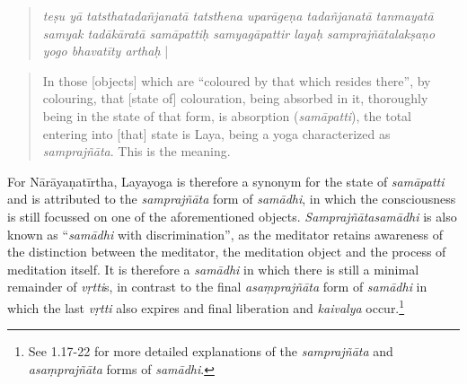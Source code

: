\begin{quote}
\textit{teṣu yā tatsthatadañjanatā tatsthena uparāgeṇa tadañjanatā tanmayatā samyak tadākāratā samāpattiḥ samyagāpattir layaḥ samprajñātalakṣaṇo yogo bhavatīty arthaḥ} |
\end{quote}
\begin{quote}
In those [objects] which are ``coloured by that which resides there'', by colouring, that [state of] colouration, being absorbed in it, thoroughly being in the state of that form, is absorption (\textit{samāpatti}), the total entering into [that] state is Laya, being a yoga characterized as \textit{samprajñāta}. This is the meaning.
\end{quote}

For Nārāyaṇatīrtha, Layayoga is therefore a synonym for the state of \textit{samāpatti} and is attributed to the \textit{samprajñāta} form of \textit{samādhi}, in which the consciousness is still focussed on one of the aforementioned objects. \textit{Samprajñātasamādhi} is also known as ``\textit{samādhi} with discrimination'', as the meditator retains awareness of the distinction between the meditator, the meditation object and the process of meditation itself. It is therefore a \textit{samādhi} in which there is still a minimal remainder of \textit{vṛtti}s, in contrast to the final \textit{asaṃprajñāta} form of \textit{samādhi} in which the last \textit{vṛtti} also expires and final liberation and \textit{kaivalya} occur.\footnote{See  1.17-22 for more detailed explanations of the \textit{samprajñāta} and \textit{asaṃprajñāta} forms of \textit{samādhi}.}

